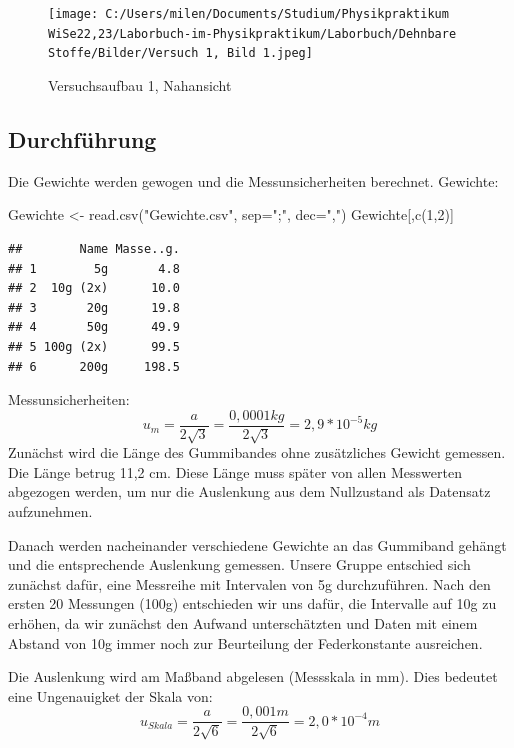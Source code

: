 \documentclass[
]{article}
\newenvironment{Shaded}{\begin{snugshade}}{\end{snugshade}}
\newcommand{\AttributeTok}[1]{\textcolor[rgb]{0.77,0.63,0.00}{#1}}
\newcommand{\DecValTok}[1]{\textcolor[rgb]{0.00,0.00,0.81}{#1}}
\newcommand{\FunctionTok}[1]{\textcolor[rgb]{0.00,0.00,0.00}{#1}}
\newcommand{\NormalTok}[1]{#1}
\newcommand{\OtherTok}[1]{\textcolor[rgb]{0.56,0.35,0.01}{#1}}
\newcommand{\StringTok}[1]{\textcolor[rgb]{0.31,0.60,0.02}{#1}}
\begin{document}
\begin{figure}
\centering
\texttt{[image: C:/Users/milen/Documents/Studium/Physikpraktikum WiSe22,23/Laborbuch-im-Physikpraktikum/Laborbuch/Dehnbare Stoffe/Bilder/Versuch 1, Bild 1.jpeg]}
\caption{Versuchsaufbau 1, Nahansicht}
\end{figure}

\hypertarget{durchfuxfchrung}{%
\subsection{Durchführung}\label{durchfuxfchrung}}

Die Gewichte werden gewogen und die Messunsicherheiten berechnet.
Gewichte:

\begin{Shaded}
\begin{Highlighting}[]
\NormalTok{Gewichte }\OtherTok{\textless{}{-}} \FunctionTok{read.csv}\NormalTok{(}\StringTok{"Gewichte.csv"}\NormalTok{, }\AttributeTok{sep=}\StringTok{";"}\NormalTok{, }\AttributeTok{dec=}\StringTok{","}\NormalTok{)}
\NormalTok{Gewichte[,}\FunctionTok{c}\NormalTok{(}\DecValTok{1}\NormalTok{,}\DecValTok{2}\NormalTok{)]}
\end{Highlighting}
\end{Shaded}

\begin{verbatim}
##        Name Masse..g.
## 1        5g       4.8
## 2  10g (2x)      10.0
## 3       20g      19.8
## 4       50g      49.9
## 5 100g (2x)      99.5
## 6      200g     198.5
\end{verbatim}

Messunsicherheiten:
\[u_m=\frac{a}{2\sqrt{3}}= \frac{0,0001kg}{2\sqrt{3}}=2,9*10^{-5}kg\]
Zunächst wird die Länge des Gummibandes ohne zusätzliches Gewicht
gemessen. Die Länge betrug 11,2 cm. Diese Länge muss später von allen
Messwerten abgezogen werden, um nur die Auslenkung aus dem Nullzustand
als Datensatz aufzunehmen.

Danach werden nacheinander verschiedene Gewichte an das Gummiband
gehängt und die entsprechende Auslenkung gemessen. Unsere Gruppe
entschied sich zunächst dafür, eine Messreihe mit Intervalen von 5g
durchzuführen. Nach den ersten 20 Messungen (100g) entschieden wir uns
dafür, die Intervalle auf 10g zu erhöhen, da wir zunächst den Aufwand
unterschätzten und Daten mit einem Abstand von 10g immer noch zur
Beurteilung der Federkonstante ausreichen.

Die Auslenkung wird am Maßband abgelesen (Messskala in mm). Dies
bedeutet eine Ungenauigket der Skala von:
\[u_{Skala}=\frac{a}{2\sqrt{6}}= \frac{0,001m}{2\sqrt{6}}=2,0*10^{-4}m\]
\end{document}
